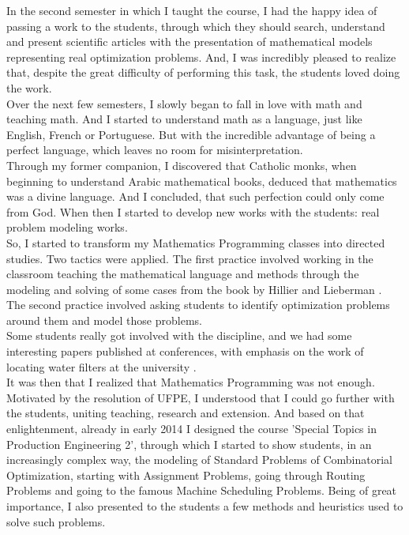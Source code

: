 \documentclass{book}
\begin{document}
In the second semester in which I taught the course, I had the happy idea of passing a work to the students, through which they should search, understand and present scientific articles with the presentation of mathematical models representing real optimization problems. And, I was incredibly pleased to realize that, despite the great difficulty of performing this task, the students loved doing the work. \\

Over the next few semesters, I slowly began to fall in love with math and teaching math. And I started to understand math as a language, just like English, French or Portuguese. But with the incredible advantage of being a perfect language, which leaves no room for misinterpretation. \\

Through my former companion, I discovered that Catholic monks, when beginning to understand Arabic mathematical books, deduced that mathematics was a divine language. And I concluded, that such perfection could only come from God. When then I started to develop new works with the students: real problem modeling works. \\

So, I started to transform my Mathematics Programming classes into directed studies. Two tactics were applied. The first practice involved working in the classroom teaching the mathematical language and methods through the modeling and solving of some cases from the book by Hillier and Lieberman \cite{HillierLieberman2010}. The second practice involved asking students to identify optimization problems around them and model those problems. \\

Some students really got involved with the discipline, and we had some interesting papers published at conferences, with emphasis on the work of locating water filters at the university \cite{AndradeAndFraga2016}. \\

It was then that I realized that Mathematics Programming was not enough. Motivated by the resolution of UFPE, I understood that I could go further with the students, uniting teaching, research and extension. And based on that enlightenment, already in early 2014 I designed the course 'Special Topics in Production Engineering 2', through which I started to show students, in an increasingly complex way, the modeling of Standard Problems of Combinatorial Optimization, starting with Assignment Problems, going through Routing Problems and going to the famous Machine Scheduling Problems. Being of great importance, I also presented to the students a few methods and heuristics used to solve such problems. \\
\end{document}
